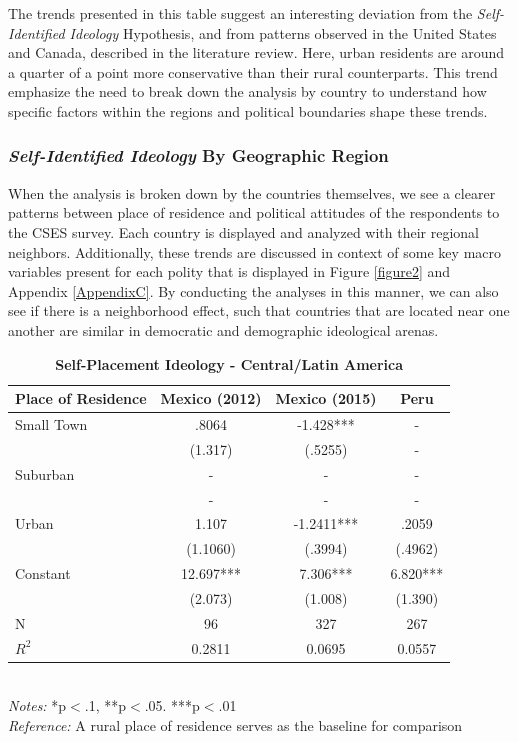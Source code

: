 \documentclass[12pt, titlepage]{article}
\newcommand\e{\emph}
\newcommand\tb{\textbf}
\begin{document}
The trends presented in this table suggest an interesting deviation from the \e{Self-Identified Ideology} Hypothesis, and from patterns observed in the United States and Canada, described in the literature review. Here, urban residents are around a quarter of a point more conservative than their rural counterparts. This trend emphasize the need to break down the analysis by country to understand how specific factors within the regions and political boundaries shape these trends.

\subsubsection{\e{Self-Identified Ideology} By Geographic Region}

When the analysis is broken down by the countries themselves, we see a clearer patterns between place of residence and political attitudes of the respondents to the CSES survey. Each country is displayed and analyzed with their regional neighbors. Additionally, these trends are discussed in context of some key macro variables present for each polity that is displayed in Figure \ref{figure2} and Appendix \ref{AppendixC}. By conducting the analyses in this manner, we can also see if there is a neighborhood effect, such that countries that are located near one another are similar in democratic and demographic ideological arenas.

\begin{singlespace}
	\begin{table}[H]
		\centering
		\caption{\tb{Self-Placement Ideology - Central/Latin America}}
		\begin{tabulary}{\linewidth}{l c c c}
			\\
			\hline
			\tb{Place of Residence}&\tb{Mexico (2012)}&\tb{Mexico (2015)} &\tb{Peru}\\
			\hline
			Small Town  & .8064   &-1.428***    & -   \\      
			 & (1.317) & (.5255)    & -    \\
			Suburban     & -   & -   & -    \\ 
			  & -    & -   & -    \\
			Urban    & 1.107  & -1.2411***   & .2059  \\
			  &(1.1060)   & (.3994)  & (.4962)      \\
			Constant  & 12.697*** & 7.306*** & 6.820***  \\
			&(2.073)&(1.008)&(1.390) \\
			N   &96   & 327 & 267   \\
			$R^2$ & 0.2811   &0.0695   &0.0557     \\
			\hline                   
		\end{tabulary} 
		\\
		\e{Notes:} *p$<$.1, **p$<$.05. ***p$<$.01 \\
		\e{Reference:} A rural place of residence serves as the baseline for comparison
		\label{table4}
	\end{table}
\end{singlespace}
\end{document}

